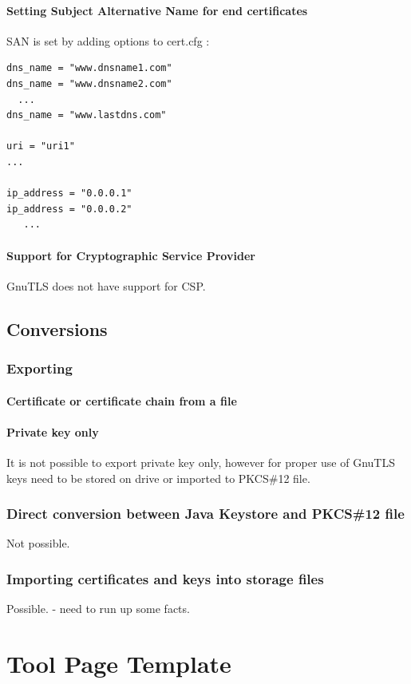 \documentclass[10pt, a4paper]{report}
\begin{document}
    \subsubsection{Setting Subject Alternative Name for end certificates}
SAN is set by adding options to cert.cfg :
\begin{verbatim}
dns_name = "www.dnsname1.com"
dns_name = "www.dnsname2.com"
  ...
dns_name = "www.lastdns.com"

uri = "uri1"
...

ip_address = "0.0.0.1"
ip_address = "0.0.0.2"
   ...
\end{verbatim}    

    \subsubsection{Support for Cryptographic Service Provider}
GnuTLS does not have support for CSP.
\section{Conversions}

  \subsection{Exporting}
  
    \subsubsection{Certificate or certificate chain from a file}
    
    \subsubsection{Private key only}
It is not possible to export private key only, however for proper use of GnuTLS keys need to be stored on drive or imported to PKCS\#12 file.
  \subsection{Direct conversion between Java Keystore and PKCS\#12 file}
Not possible.
  \subsection{Importing certificates and keys into storage files}
Possible. - need to run up some facts.  

\chapter{Tool Page Template}
\end{document}
